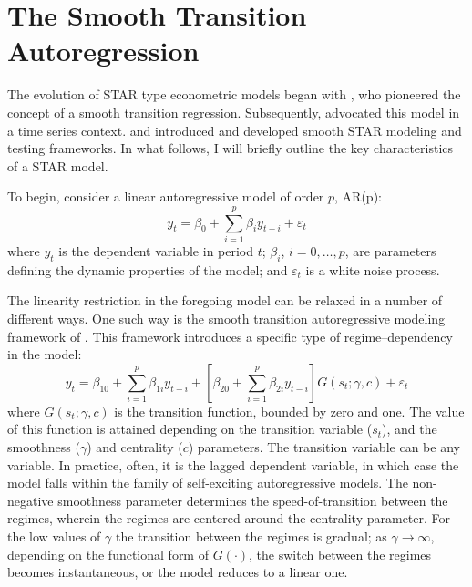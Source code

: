 \documentclass[11pt]{article}
\begin{document}
\section{The Smooth Transition Autoregression}

The evolution of STAR type econometric models began with \cite{bacon1971}, who pioneered the concept of a smooth transition regression. Subsequently, \cite{chan1986} advocated this model in a time series context. \cite{luukkonen1988} and \cite{terasvirta1994} introduced and developed smooth STAR modeling and testing frameworks. In what follows, I will briefly outline the key characteristics of a STAR model. 

To begin, consider a linear autoregressive model of order $p$, AR(p):
\begin{equation}
y_t = \beta_0 + \sum_{i=1}^{p}{\beta_i y_{t-i}} + \varepsilon_t
\label{ar}
\end{equation}
where $y_t$ is the dependent variable in period $t$; $\beta_i$, $i=0,\ldots,p$, are parameters defining the dynamic properties of the model; and $\varepsilon_t$ is a white noise process. 

The linearity restriction in the foregoing model can be relaxed in a number of different ways. One such way is the smooth transition autoregressive modeling framework of \cite{terasvirta1994}. This framework introduces a specific type of regime--dependency in the model:
\begin{equation}
y_t = \beta_{10} + \sum_{i=1}^{p}{\beta_{1i} y_{t-i}}  + \left[\beta_{20} + \sum_{i=1}^{p}{\beta_{2i} y_{t-i}} \right]G\left(s_t;\gamma,c\right) + \varepsilon_t
\label{star}
\end{equation} 
where $G(s_t;\gamma,c)$ is the transition function, bounded by zero and one. The value of this function is attained depending on the transition variable ($s_t$), and the smoothness ($\gamma$) and centrality ($c$) parameters. The transition variable can be any variable. In practice, often, it is the lagged dependent variable, in which case the model falls within the family of self-exciting autoregressive models. The non-negative smoothness parameter determines the speed-of-transition between the regimes, wherein the regimes are centered around the centrality parameter. For the low values of $\gamma$ the transition between the regimes is gradual; as $\gamma\rightarrow\infty$, depending on the functional form of $G(\cdot)$, the switch between the regimes becomes instantaneous, or the model reduces to a linear one. 
\end{document}
